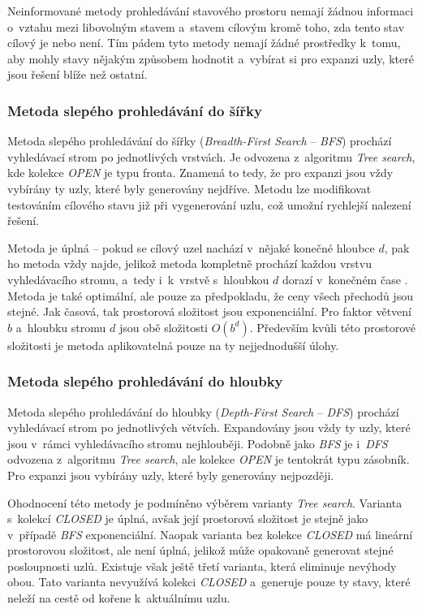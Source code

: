 Neinformované metody prohledávání stavového prostoru nemají žádnou informaci o~vztahu mezi libovolným stavem a~stavem cílovým kromě toho, zda tento stav cílový je nebo není. Tím pádem tyto metody nemají žádné prostředky k~tomu, aby mohly stavy nějakým způsobem hodnotit a~vybírat si pro expanzi uzly, které jsou řešení blíže než ostatní.

\subsubsection*{Metoda slepého prohledávání do šířky}

Metoda slepého prohledávání do šířky (\emph{Breadth-First Search} -- \emph{BFS}) \cite{AI_Russel_Norvig} prochází vyhledávací strom po jednotlivých vrstvách. Je odvozena z~algoritmu \emph{Tree search}, kde kolekce \emph{OPEN} je typu fronta. Znamená to tedy, že pro expanzi jsou vždy vybírány ty uzly, které byly generovány nejdříve. Metodu lze modifikovat testováním cílového stavu již při vygenerování uzlu, což umožní rychlejší nalezení řešení.

Metoda je úplná -- pokud se cílový uzel nachází v~nějaké konečné hloubce $d$, pak ho metoda vždy najde, jelikož metoda kompletně prochází každou vrstvu vyhledávacího stromu, a~tedy i~k~vrstvě s~hloubkou $d$ dorazí v~konečném čase \cite{AI_Ertel}. Metoda je také optimální, ale pouze za předpokladu, že ceny všech přechodů jsou stejné. Jak časová, tak prostorová složitost jsou exponenciální. Pro faktor větvení $b$ a~hloubku stromu $d$ jsou obě složitosti $O(b^d)$. Především kvůli této prostorové složitosti je metoda aplikovatelná pouze na ty nejjednodušší úlohy.

\subsubsection*{Metoda slepého prohledávání do hloubky}

Metoda slepého prohledávání do hloubky (\emph{Depth-First Search} -- \emph{DFS}) \cite{AI_Russel_Norvig} prochází vyhledávací strom po jednotlivých větvích. Expandovány jsou vždy ty uzly, které jsou v~rámci vyhledávacího stromu nejhlouběji. Podobně jako \emph{BFS} je i~\emph{DFS} odvozena z~algoritmu \emph{Tree search}, ale kolekce \emph{OPEN} je tentokrát typu zásobník. Pro expanzi jsou vybírány uzly, které byly generovány nejpozději.

Ohodnocení této metody je podmíněno výběrem varianty \emph{Tree search}. Varianta s~kolekcí \emph{CLOSED} je úplná, avšak její prostorová složitost je stejně jako v~případě \emph{BFS} exponenciální. Naopak varianta bez kolekce \emph{CLOSED} má lineární prostorovou složitost, ale není úplná, jelikož může opakovaně generovat stejné posloupnosti uzlů. Existuje však ještě třetí varianta, která eliminuje nevýhody obou. Tato varianta nevyužívá kolekci \emph{CLOSED} a~generuje pouze ty stavy, které neleží na cestě od kořene k~aktuálnímu uzlu.

